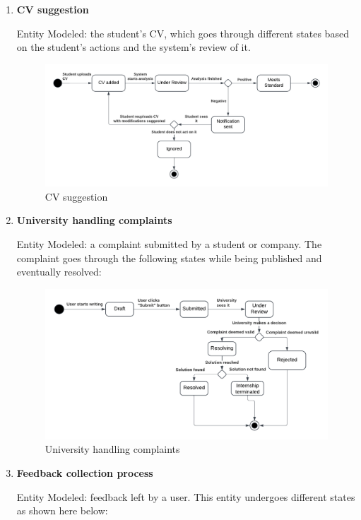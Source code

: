 \begin{enumerate}
\item \textbf{CV suggestion}

Entity Modeled: the student’s CV, which goes through different states based on the student's actions and the system's review of it.

\begin{figure}[H]
    \centering
    \includegraphics[width=1\linewidth]{RASD//Images/CV.png}
    \caption{CV suggestion}
    \label{fig:enter-label}
\end{figure}

\item \textbf{University handling complaints}

Entity Modeled: a complaint submitted by a student or company. The complaint goes through the following states while being published and eventually resolved:

\begin{figure}[H]
    \centering
    \includegraphics[width=1\linewidth]{RASD//Images/Complaints.png}
    \caption{University handling complaints}
    \label{fig:enter-label}
\end{figure}


\item \textbf{Feedback collection process}

Entity Modeled: feedback left by a user. This entity undergoes different states as shown here below: 


\end{enumerate}
